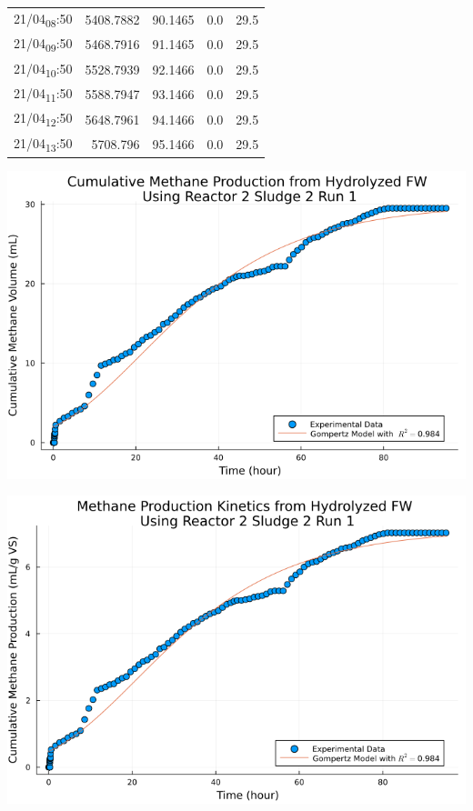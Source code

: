 \documentclass[11pt]{article}
\begin{document}
\begin{center}
\begin{tabular}{lrrrr}
21/04\textsubscript{08}:50 & 5408.7882 & 90.1465 & 0.0 & 29.5\\[0pt]
21/04\textsubscript{09}:50 & 5468.7916 & 91.1465 & 0.0 & 29.5\\[0pt]
21/04\textsubscript{10}:50 & 5528.7939 & 92.1466 & 0.0 & 29.5\\[0pt]
21/04\textsubscript{11}:50 & 5588.7947 & 93.1466 & 0.0 & 29.5\\[0pt]
21/04\textsubscript{12}:50 & 5648.7961 & 94.1466 & 0.0 & 29.5\\[0pt]
21/04\textsubscript{13}:50 & 5708.796 & 95.1466 & 0.0 & 29.5\\[0pt]
\end{tabular}
\end{center}


\begin{center}
\includegraphics[width=.9\linewidth]{../plots/BMPs/Hydrolyzed FW/methane_kinetics_hydrolysate_2_s2_r1_hour.png}
\end{center}

\begin{center}
\includegraphics[width=.9\linewidth]{../plots/BMPs/Hydrolyzed FW/specific_methane_kinetics_hydrolysate_2_s2_r1_hour.png}
\end{center}
\end{document}
